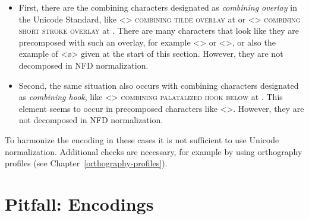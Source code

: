 \begin{itemize}
  
  \item First, there are the combining characters designated as \textit{combining
        overlay} in the Unicode Standard, like <>
        \textsc{combining tilde overlay} at  or <>
        \textsc{combining short stroke overlay} at . There are many
        characters that look like they are precomposed with such an overlay,
        for example <> or <>, or also the
        example of <ø> given at the start of this section. However, they are 
        not decomposed in NFD normalization.
  \item Second, the same situation also occurs with combining characters
        designated as \textit{combining hook}, like 
        <{}> \textsc{combining
        palatalized hook below} at . This element seems to occur in
        precomposed characters like <>. However, they are 
        not decomposed in NFD normalization.
        
\end{itemize}

To harmonize the encoding in these cases it is not sufficient to use Unicode 
normalization. Additional checks are necessary, for example by using orthography 
profiles (see Chapter~\ref{orthography-profiles}).


\section{Pitfall: Encodings}
\label{encodings}


